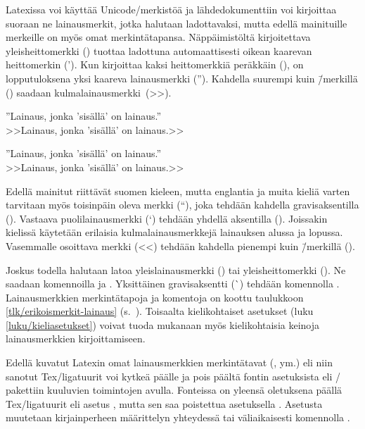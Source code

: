 Latexissa voi käyttää Unicode\-/merkistöä ja lähdedokumenttiin voi
kirjoittaa suoraan ne lainausmerkit, jotka halutaan ladottavaksi, mutta
edellä mainituille merkeille on myös omat merkintätapansa.
Näppäimistöltä kirjoitettava yleisheittomerkki () tuottaa
ladottuna automaattisesti oikean kaarevan heittomerkin ('). Kun
kirjoittaa kaksi heittomerkkiä peräkkäin (), on
lopputuloksena yksi kaareva lainausmerkki (''). Kahdella suurempi kuin
\=/merkillä (\koodim{>>}) saadaan kulmalainausmerkki~(>>).

\begin{koodilohkosis}
''Lainaus, jonka 'sisällä' on lainaus.'' \\
>>Lainaus, jonka 'sisällä' on lainaus.>>
\end{koodilohkosis}

\begin{tulossis}
  ''Lainaus, jonka 'sisällä' on lainaus.'' \\
  >>Lainaus, jonka 'sisällä' on lainaus.>>
\end{tulossis}

\noindent
Edellä mainitut riittävät suomen kieleen, mutta englantia ja muita
kieliä varten tarvitaan myös toisinpäin oleva merkki (``), joka tehdään
kahdella gravisaksentilla (). Vastaava puolilainausmerkki (`)
tehdään yhdellä aksentilla (). Joissakin kielissä käytetään
erilaisia kulmalainausmerkkejä lainauksen alussa ja lopussa. Vasemmalle
osoittava merkki (<<) tehdään kahdella pienempi kuin \=/merkillä
(\koodim{<<}).

Joskus todella halutaan latoa yleislainausmerkki (\textquotedbl) tai
yleisheittomerkki (\textquotesingle). Ne saadaan komennoilla
 ja . Yksittäinen
gravisaksentti (\`{}) tehdään komennolla \komentoarg{}.
Lainausmerkkien merkintätapoja ja komentoja on koottu taulukkoon
\ref{tlk/erikoismerkit-lainaus}
(s.~\pageref{tlk/erikoismerkit-lainaus}). Toisaalta kielikohtaiset
asetukset (luku \ref{luku/kieliasetukset}) voivat tuoda mukanaan myös
kielikohtaisia keinoja lainausmerkkien kirjoittamiseen.

Edellä kuvatut Latexin omat lainausmerkkien merkintätavat (,
\koodi{>>} ym.) eli niin sanotut Tex\-/ligatuurit voi kytkeä päälle ja
pois päältä fontin asetuksista eli \-/ pakettiin
kuuluvien toimintojen avulla. Fonteissa on yleensä oletuksena päällä
Tex\-/ligatuurit eli asetus , mutta sen saa
poistettua asetuksella . Asetusta
muutetaan kirjainperheen määrittelyn yhteydessä tai väliaikaisesti
komennolla .

